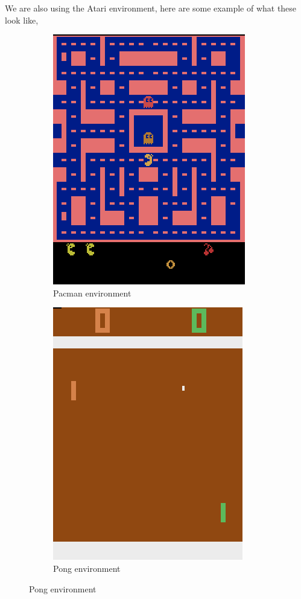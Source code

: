 \documentclass[11pt]{article}
\begin{document}
We are also using the Atari environment, here are some example of what these look like,
\begin{figure}[H]
    \begin{subfigure}[b]{.5\textwidth}
        \centering
        \includegraphics[scale=0.75]{include/pacman.png}
        \caption{Pacman environment}
    \end{subfigure}
    \begin{subfigure}[b]{.5\textwidth}
        \centering
        \includegraphics[scale=0.75]{include/pong.png}
        \caption{Pong environment}

\end{subfigure}
\end{figure}
\end{document}
